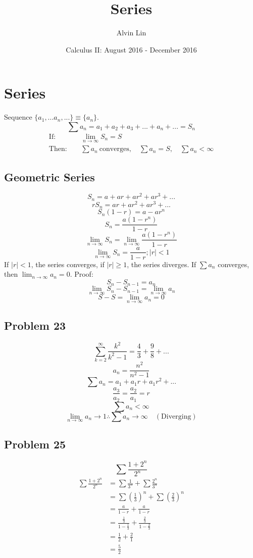 \documentclass{math}
\title{Series}
\author{Alvin Lin}
\date{Calculus II: August 2016 - December 2016}
\begin{document}
\maketitle

\section*{Series}
Sequence \( \bigg\{a_{1},...a_{n},...\bigg\} \equiv \bigg\{a_{n}\bigg\} \).
\[ \sum{a_{n}} = a_{1}+a_{2}+a_{3}+...+a_{n}+... = S_{n} \]
\begin{align*}
  \mathrm{If:} & \quad \lim_{n\to\infty}{S_{n}} = S \\
  \mathrm{Then:} & \quad \sum{a_{n}} \mathrm{\ converges},
    \quad \sum{a_{n}} = S, \quad \sum{a_{n}}<\infty
\end{align*}

\subsection*{Geometric Series}
\[ S_{n} = a+ar+ar^{2}+ar^{3}+... \]
\[ rS_{n} = ar+ar^{2}+ar^{3}+... \]
\[ S_{n}(1-r) = a-ar^{n} \]
\[ S_{n} = \frac{a(1-r^{n})}{1-r} \]
\[ \lim_{n\to\infty}{S_{n}} = \lim_{n\to\infty}{\frac{a(1-r^{n})}{1-r}} \]
\[ \lim_{n\to\infty}{S_{n}} = \frac{a}{1-r}; |r| < 1 \]
If \( |r| < 1 \), the series converges, if \( |r| \geq 1 \), the series
diverges. If \( \sum{a_{n}} \) converges,
then \( \lim_{n\to\infty}{a_{n}} = 0 \). Proof:
\[ S_{n}-S_{n-1} = a_{n} \]
\[ \lim_{n\to\infty}{S_{n}-S_{n-1}} = \lim_{n\to\infty}{a_{n}} \]
\[ S-S = \lim_{n\to\infty}{a_{n}} = 0 \]

\subsection*{Problem 23}
\[ \sum_{k=2}^{\infty}\frac{k^{2}}{k^{2}-1} = \frac{4}{3}+\frac{9}{8}+...\]
\[ a_{n} = \frac{n^{2}}{n^{2}-1} \]
\[ \sum{a_{n}} = a_{1}+a_{1}r+a_{1}r^{2}+... \]
\[ \frac{a_{3}}{a_{2}} = \frac{a_{2}}{a_{1}} = r \]
\[ \sum{a_{n}} < \infty \]
\[ \lim_{n\to\infty}a_{n}\to1 \therefore \sum{a_{n}}\to\infty \quad
   \mathrm{(Diverging)} \]

\subsection*{Problem 25}
\[ \sum\frac{1+2^{n}}{2^{n}} \]
\begin{align*}
  \sum\frac{1+2^{n}}{2^{n}} &= \sum\frac{1}{3^{n}}+\sum\frac{2^{n}}{3^{n}} \\
  &= \sum(\frac{1}{3})^{n}+\sum(\frac{2}{3})^{n} \\
  &= \frac{a}{1-r}+\frac{a}{1-r} \\
  &= \frac{\frac{1}{3}}{1-\frac{1}{3}}+\frac{\frac{2}{3}}{1-\frac{2}{3}} \\
  &= \frac{1}{2}+\frac{2}{1} \\
  &= \frac{5}{2}
\end{align*}
\end{document}
